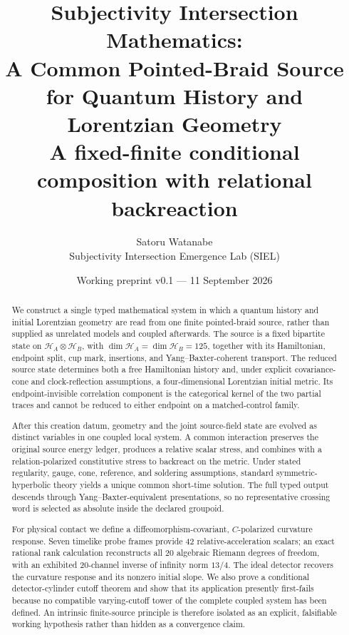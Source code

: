 \documentclass[11pt]{article}
\title{\vspace{-1.2cm}\textbf{Subjectivity Intersection Mathematics:}\\[0.18em]\textbf{A Common Pointed-Braid Source for Quantum History and Lorentzian Geometry}\\[0.35em]\Large A fixed-finite conditional composition with relational backreaction}
\author{Satoru Watanabe\\\small Subjectivity Intersection Emergence Lab (SIEL)}
\date{Working preprint v0.1 --- 11 September 2026}
\theoremstyle{definition}
\theoremstyle{remark}
\newcommand{\cH}{\mathcal{H}}
\begin{document}
\maketitle

\begin{center}
\end{center}

\begin{abstract}
We construct a single typed mathematical system in which a quantum history and initial Lorentzian geometry are read from one finite pointed-braid source, rather than supplied as unrelated models and coupled afterwards. The source is a fixed bipartite state on $\cH_A\otimes\cH_B$, with $\dim\cH_A=\dim\cH_B=125$, together with its Hamiltonian, endpoint split, cup mark, insertions, and Yang--Baxter-coherent transport. The reduced source state determines both a free Hamiltonian history and, under explicit covariance-cone and clock-reflection assumptions, a four-dimensional Lorentzian initial metric. Its endpoint-invisible correlation component is the categorical kernel of the two partial traces and cannot be reduced to either endpoint on a matched-control family.

After this creation datum, geometry and the joint source-field state are evolved as distinct variables in one coupled local system. A common interaction preserves the original source energy ledger, produces a relative scalar stress, and combines with a relation-polarized constitutive stress to backreact on the metric. Under stated regularity, gauge, cone, reference, and soldering assumptions, standard symmetric-hyperbolic theory yields a unique common short-time solution. The full typed output descends through Yang--Baxter-equivalent presentations, so no representative crossing word is selected as absolute inside the declared groupoid.

For physical contact we define a diffeomorphism-covariant, $C$-polarized curvature response. Seven timelike probe frames provide 42 relative-acceleration scalars; an exact rational rank calculation reconstructs all 20 algebraic Riemann degrees of freedom, with an exhibited 20-channel inverse of infinity norm $13/4$. The ideal detector recovers the curvature response and its nonzero initial slope. We also prove a conditional detector-cylinder cutoff theorem and show that its application presently first-fails because no compatible varying-cutoff tower of the complete coupled system has been defined. An intrinsic finite-source principle is therefore isolated as an explicit, falsifiable working hypothesis rather than hidden as a convergence claim.
\end{abstract}
\end{document}
